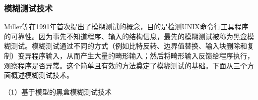 %
%
%
%
%

\subsubsection{模糊测试技术}

Miller等在1991年首次提出了模糊测试的概念，目的是检测UNIX命令行工具程序的可靠性。因为事先不知道程序、输入的结构信息，最先的模糊测试被称为黑盒模糊测试。模糊测试通过不同的方式（例如比特反转、边界值替换、输入块删除和复制）变异程序输入，从而产生大量的畸形输入；然后将畸形输入反馈给程序执行，观察程序是否异常。这个简单且有效的方法奠定了模糊测试的基础。下面从三个方面概述模糊测试技术。

（1）基于模型的黑盒模糊测试技术


